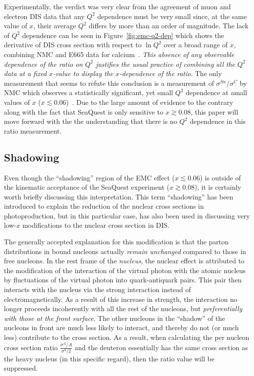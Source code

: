 Experimentally, the verdict was very clear from the agreement of muon and electron DIS data that any $Q^2$ dependence must be very small since, at the same value of $x$, their average $Q^2$ differs by more than an order of magnitude. The lack of $Q^2$ dependence can be seen in Figure~\ref{fig:emc-q2-dep} which shows the derivative of DIS cross section with respect to $\ln Q^2$ over a broad range of $x$, combining NMC and E665 data for calcium~\cite{Geesaman:1995yd}.  \emph{This absence of any observable dependence of the ratio on $Q^2$ justifies the usual practice of combining all the $Q^2$ data at a fixed $x$-value to display the $x$-dependence of the ratio}. The only measurement that seems to refute this conclusion is a measurement of $\sigma^{Sn}/\sigma^C$ by NMC which observes a statistically significant, yet small $Q^2$ dependence at amall values of $x$ ($x\lesssim 0.06$)~\cite{Arneodo:1996qe}. Due to the large amount of evidence to the contrary along with the fact that SeaQuest is only sensitive to $x\gtrsim0.08$, this paper will move forward with the the understanding that there is no $Q^2$ dependence in this ratio measurement.

\subsection{Shadowing}

Even though the ``shadowing'' region of the EMC effect ($x\lesssim 0.06$) is outside of the kinematic acceptance of the SeaQuest experiment ($x\gtrsim0.08$), it is certainly worth briefly discussing this interpretation. This term ``shadowing'' has been introduced to explain the reduction of the nuclear cross sections in photoproduction, but in this particular case, has also been used in discussing very low-$x$ modifications to the nuclear cross section in DIS. 

The generally accepted explanation for this modification is that the parton distributions in bound nucleons actually \emph{remain unchanged} compared to those in free nucleons. In the rest frame of the \emph{nucleus}, the nuclear effect is attributed to the modification of the interaction of the virtual photon with the atomic nucleus by fluctuations of the virtual photon into quark-antiquark pairs. This pair then interacts with the nucleus via the strong interaction instead of electromagnetically. As a result of this increase in strength, the interaction no longer proceeds incoherently with all the rest of the nucleons, but \emph{preferentially with those at the front surface}. The other nucleons in the ``shadow'' of the nucleons in front are much less likely to interact, and thereby do not (or much less) contribute to the cross section. As a result, when calculating the per nucleon cross section ratio $\frac{\sigma^A/A}{\sigma^d/2}$ and the deuteron essentially has the same cross section as the heavy nucleus (in this specific regard), then the ratio value will be suppressed.  

